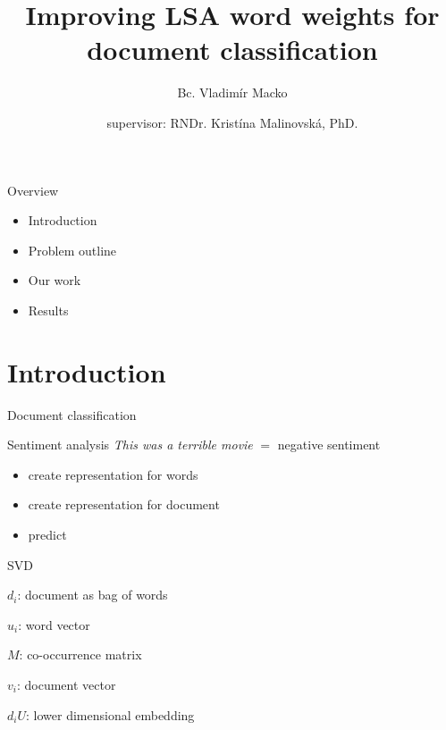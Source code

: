 \documentclass[xcolor={table}]{beamer}
\title[eLSA]{Improving LSA word weights for document classification}
\author[Macko, Malinovska] %
{Bc. Vladimír Macko\inst{1} \and supervisor: RNDr. Kristína Malinovská, PhD.\inst{1}}
\institute[VFU] %
{
  \inst{1}%
  Comenius University\\
  Faculty of Mathematics, Physics and Informatics
}
\begin{document}
        
\begin{frame}
    \titlepage
\end{frame}
    
\begin{frame}{Overview}
    \begin{block}{}
        \begin{itemize}
            \item Introduction
            \item Problem outline
            \item Our work
            \item Results
        \end{itemize}
    \end{block}
\end{frame}

\section{Introduction}
\begin{frame}{Document classification}
    \begin{block}{Sentiment analysis}
        \emph{This was a terrible movie} $=$ negative sentiment
    \end{block}
    
    \begin{block}{}   
        \begin{itemize}
            \item create representation for words
            \item create representation for document
            \item predict
        \end{itemize}
    \end{block}
\end{frame} 

\begin{frame}{SVD}
~
    {\tiny }
    \begin{block}
        
        $d_i$: document as bag of words
        
        $u_i$: word vector
        
        $M$: co-occurrence matrix
        
        $v_i$: document vector
        
        $d_i U$: lower dimensional embedding
    \end{block}
\end{frame}
\end{document}
